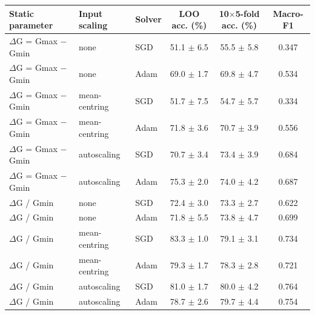 \begin{tabular}{lllccc}
\toprule
\textbf{Static parameter} & \textbf{Input scaling} & \textbf{Solver} & \textbf{LOO acc. (\%)} & \textbf{10$\times$5-fold acc. (\%)} & \textbf{Macro-F1} \\
\midrule
$\Delta$G = Gmax $-$ Gmin & none & SGD & 51.1 $\pm$ 6.5 & 55.5 $\pm$ 5.8 & 0.347 \\
$\Delta$G = Gmax $-$ Gmin & none & Adam & 69.0 $\pm$ 1.7 & 69.8 $\pm$ 4.7 & 0.534 \\
$\Delta$G = Gmax $-$ Gmin & mean-centring & SGD & 51.7 $\pm$ 7.5 & 54.7 $\pm$ 5.7 & 0.334 \\
$\Delta$G = Gmax $-$ Gmin & mean-centring & Adam & 71.8 $\pm$ 3.6 & 70.7 $\pm$ 3.9 & 0.556 \\
$\Delta$G = Gmax $-$ Gmin & autoscaling & SGD & 70.7 $\pm$ 3.4 & 73.4 $\pm$ 3.9 & 0.684 \\
$\Delta$G = Gmax $-$ Gmin & autoscaling & Adam & 75.3 $\pm$ 2.0 & 74.0 $\pm$ 4.2 & 0.687 \\
$\Delta$G / Gmin & none & SGD & 72.4 $\pm$ 3.0 & 73.3 $\pm$ 2.7 & 0.622 \\
$\Delta$G / Gmin & none & Adam & 71.8 $\pm$ 5.5 & 73.8 $\pm$ 4.7 & 0.699 \\
$\Delta$G / Gmin & mean-centring & SGD & 83.3 $\pm$ 1.0 & 79.1 $\pm$ 3.1 & 0.734 \\
$\Delta$G / Gmin & mean-centring & Adam & 79.3 $\pm$ 1.7 & 78.3 $\pm$ 2.8 & 0.721 \\
$\Delta$G / Gmin & autoscaling & SGD & 81.0 $\pm$ 1.7 & 80.0 $\pm$ 4.2 & 0.764 \\
$\Delta$G / Gmin & autoscaling & Adam & 78.7 $\pm$ 2.6 & 79.7 $\pm$ 4.4 & 0.754 \\
\bottomrule
\end{tabular}
